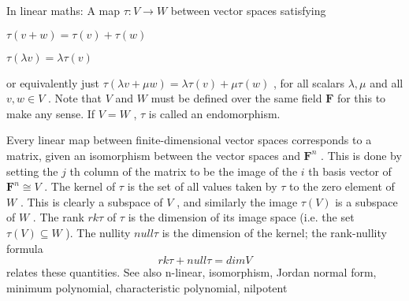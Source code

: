 In linear maths: A map  $  \tau  : V \to W $  between vector spaces satisfying
   \par
  $  \tau (v+w)= \tau (v)+ \tau (w) $ 
   \par
  $  \tau ( \lambda v)= \lambda  \tau (v) $ 
\par
or equivalently just
 $  \tau ( \lambda v+ \mu w)= \lambda  \tau (v)+ \mu  \tau (w) $ , for all
scalars  $  \lambda, \mu $  and all  $ v,w \in V $ . Note that  $ V $  and  $ W $  must
be defined over the same field  $\mathbf{F}$  for this to make any sense.
If  $ V=W $ ,  $  \tau  $  is called an  endomorphism.
\par
Every linear map between finite-dimensional vector spaces corresponds
to a matrix, given an isomorphism between the vector spaces and
 $  \mathbf{F}^n $ . This is done by setting the  $ j $ th column of the matrix to be
the image of the  $ i $ th basis vector of  $  \mathbf{F}^n \cong V $ .
The  kernel of  $  \tau  $  is the set of all values taken by  $  \tau  $ 
to the zero element of  $ W $ . This is clearly a subspace of  $ V $ ,
and similarly the image  $  \tau (V) $  is a subspace of  $ W $ .
The  rank  $  rk \tau   $  of  $  \tau  $  is the dimension of its image
space (i.e.  the set  $  \tau (V) \subseteq W $ ). The  nullity  $  null  \tau  $ 
 is the
dimension of the kernel; the  rank-nullity formula
 \[ rk  \tau + null  \tau = dim V \]
relates these quantities.
See also n-linear, isomorphism, Jordan normal form,
minimum polynomial, characteristic polynomial,
nilpotent